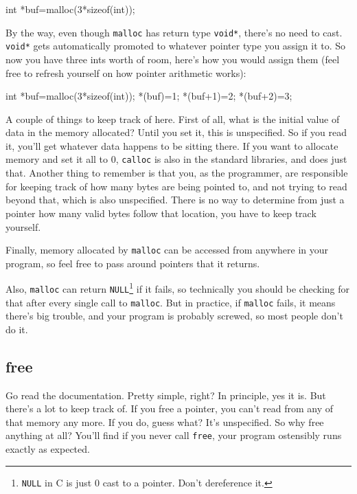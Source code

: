 \documentclass[ebook,11pt,oneside,openany]{memoir}
\newcommand{\cf}[1]{\texttt{#1}}
\begin{document}
\begin{code}[language=C]
int *buf=malloc(3*sizeof(int));
\end{code}

By the way, even though \texttt{malloc} has return type \texttt{void*}, there's no need to cast. \texttt{void*} gets automatically promoted to whatever pointer type you assign it to. So now you have three ints worth of room, here's how you would assign them (feel free to refresh yourself on how pointer arithmetic works):

\begin{code}[language=C]
int *buf=malloc(3*sizeof(int));
*(buf)=1;
*(buf+1)=2;
*(buf+2)=3;
\end{code}

A couple of things to keep track of here. First of all, what is the initial value of data in the memory allocated? Until you set it, this is unspecified. So if you read it, you'll get whatever data happens to be sitting there. If you want to allocate memory and set it all to 0, \texttt{calloc} is also in the standard libraries, and does just that. Another thing to remember is that you, as the programmer, are responsible for keeping track of how many bytes are being pointed to, and not trying to read beyond that, which is also unspecified. There is no way to determine from just a pointer how many valid bytes follow that location, you have to keep track yourself.

Finally, memory allocated by \texttt{malloc} can be accessed from anywhere in your program, so feel free to pass around pointers that it returns.

Also, \cf{malloc} can return \cf{NULL}\footnote{\cf{NULL} in C is just 0 cast to a pointer. Don't dereference it.} if it fails, so technically you should be checking for that after every single call to \cf{malloc}. But in practice, if \cf{malloc} fails, it means there's big trouble, and your program is probably screwed, so most people don't do it.

\subsection{free}
Go read the documentation. Pretty simple, right? In principle, yes it is. But there's a lot to keep track of. If you free a pointer, you can't read from any of that memory any more. If you do, guess what? It's unspecified. So why free anything at all? You'll find if you never call \texttt{free}, your program ostensibly runs exactly as expected.
\end{document}
